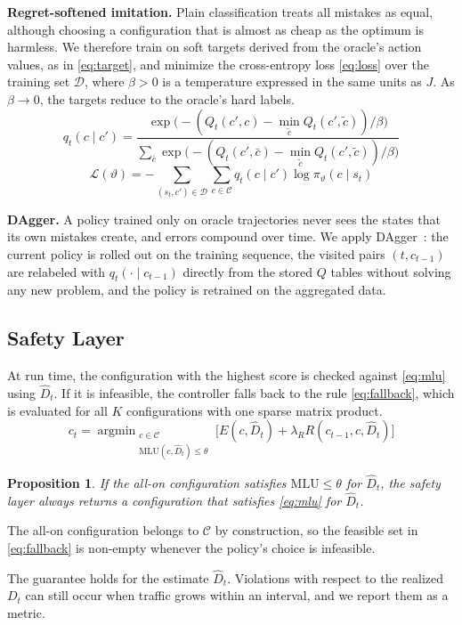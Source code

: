 \documentclass[conference]{IEEEtran}
\newtheorem{proposition}{Proposition}
\begin{document}
\textbf{Regret-softened imitation.} Plain classification treats all mistakes as equal, although choosing a configuration that is almost as cheap as the optimum is harmless. We therefore train on soft targets derived from the oracle's action values, as in \eqref{eq:target}, and minimize the cross-entropy loss \eqref{eq:loss} over the training set $\mathcal{D}$, where $\beta>0$ is a temperature expressed in the same units as $J$. As $\beta\to 0$, the targets reduce to the oracle's hard labels.
\begin{equation}\label{eq:target}
q_t(c\mid c')=\frac{\exp\!\big(-(Q_t(c',c)-\min_{\tilde c}Q_t(c',\tilde c))/\beta\big)}{\sum_{\bar c}\exp\!\big(-(Q_t(c',\bar c)-\min_{\tilde c}Q_t(c',\tilde c))/\beta\big)}
\end{equation}
\begin{equation}\label{eq:loss}
\mathcal{L}(\vartheta)=-\sum_{(s_t,c')\in\mathcal{D}}\sum_{c\in\mathcal{C}}q_t(c\mid c')\log\pi_\vartheta(c\mid s_t)
\end{equation}

\textbf{DAgger.} A policy trained only on oracle trajectories never sees the states that its own mistakes create, and errors compound over time. We apply DAgger~\cite{ross2011dagger}: the current policy is rolled out on the training sequence, the visited pairs $(t,c_{t-1})$ are relabeled with $q_t(\cdot\mid c_{t-1})$ directly from the stored $Q$ tables without solving any new problem, and the policy is retrained on the aggregated data.

\subsection{Safety Layer}

At run time, the configuration with the highest score is checked against \eqref{eq:mlu} using $\hat{D}_t$. If it is infeasible, the controller falls back to the rule \eqref{eq:fallback}, which is evaluated for all $K$ configurations with one sparse matrix product.
\begin{equation}\label{eq:fallback}
c_t=\mathop{\arg\min}_{\substack{c\in\mathcal{C}\\\mathrm{MLU}(c,\hat{D}_t)\le\theta}}\Big[E(c,\hat{D}_t)+\lambda_R R(c_{t-1},c,\hat{D}_t)\Big]
\end{equation}
\begin{proposition}\label{prop:safety}
If the all-on configuration satisfies $\mathrm{MLU}\le\theta$ for $\hat{D}_t$, the safety layer always returns a configuration that satisfies \eqref{eq:mlu} for $\hat{D}_t$.
\end{proposition}
\begin{IEEEproof}
The all-on configuration belongs to $\mathcal{C}$ by construction, so the feasible set in \eqref{eq:fallback} is non-empty whenever the policy's choice is infeasible.
\end{IEEEproof}
The guarantee holds for the estimate $\hat{D}_t$. Violations with respect to the realized $D_t$ can still occur when traffic grows within an interval, and we report them as a metric.
\end{document}
